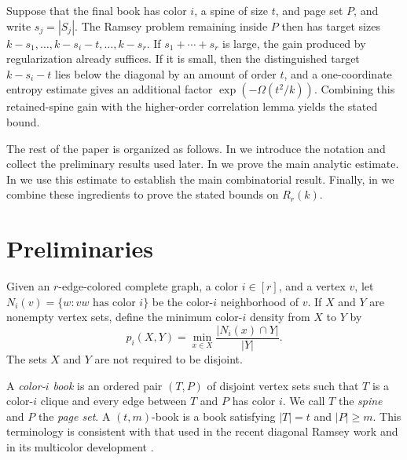 \documentclass[twoside,12pt]{article}
\theoremstyle{definition}
\theoremstyle{remark}
\newcommand{\1}{\mathbf 1}
\begin{document}
Suppose that the final book has color $i$, a spine of size $t$, and page set
$P$, and write $s_j=|S_j|$. The Ramsey problem remaining inside $P$ then has
target sizes
$
 k-s_1,\ldots,k-s_i-t,\ldots,k-s_r.
$
If $s_1+\cdots+s_r$ is large, the gain produced by regularization already
suffices. If it is small, then the distinguished target $k-s_i-t$ lies below
the diagonal by an amount of order $t$, and a one-coordinate entropy
estimate gives an additional factor
$\exp\!\left(-\Omega(t^2/k)\right)$. Combining this retained-spine gain with
the higher-order correlation lemma yields the stated bound.

The rest of the paper is organized as follows. In  we
introduce the notation and collect the preliminary results used later. In
 we prove the main analytic estimate. In 
we use this estimate to establish the main combinatorial result. Finally, in
 we combine these ingredients to prove the stated bounds
on $R_r(k)$.

\section{Preliminaries}\label{sec:prelim}

Given an $r$-edge-colored complete graph, a color $i\in[r]$, and a vertex
$v$, let
$
 N_i(v)=\{w:vw\text{ has color }i\}
$
be the color-$i$ neighborhood of $v$. If $X$ and $Y$ are nonempty vertex
sets, define the minimum color-$i$ density from $X$ to $Y$ by
\[
 p_i(X,Y)=\min_{x\in X}\frac{|N_i(x)\cap Y|}{|Y|}.
\]
The sets $X$ and $Y$ are not required to be disjoint.

A \emph{color-$i$ book} is an ordered pair $(T,P)$ of disjoint vertex sets
such that $T$ is a color-$i$ clique and every edge between $T$ and $P$ has
color $i$. We call $T$ the \emph{spine} and $P$ the \emph{page set}. A
$(t,m)$-book is a book satisfying $|T|=t$ and $|P|\ge m$. This terminology is
consistent with that used in the recent diagonal Ramsey work
\cite{CamposEtAl2026,Wigderson2025} and in its multicolor development
\cite{BalisterEtAl2026}.
\end{document}
